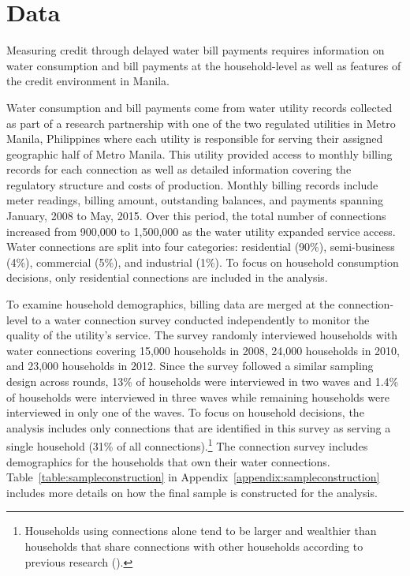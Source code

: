 \documentclass[12pt,table]{article}
\begin{document}
\section{Data}\label{section:data}



Measuring credit through delayed water bill payments requires information on water consumption and bill payments at the household-level as well as features of the credit environment in Manila.  %

Water consumption and bill payments come from water utility records collected as part of a research partnership with one of the two regulated utilities in Metro Manila, Philippines where each utility is responsible for serving their assigned geographic half of Metro Manila.  This utility provided access to monthly billing records for each connection as well as detailed information covering the regulatory structure and costs of production.  Monthly billing records include meter readings, billing amount, outstanding balances, and payments spanning January, 2008 to May, 2015. Over this period, the total number of connections increased from 900,000 to 1,500,000 as the water utility expanded service access.  Water connections are split into four categories: residential (90\%), semi-business (4\%), commercial (5\%), and industrial (1\%).  To focus on household consumption decisions, only residential connections are included in the analysis.

To examine household demographics, billing data are merged at the connection-level to a water connection survey conducted independently to monitor the quality of the utility's service.  The survey randomly interviewed households with water connections covering 15,000 households in 2008, 24,000 households in 2010, and 23,000 households in 2012.  Since the survey followed a similar sampling design across rounds, 13\% of households were interviewed in two waves and 1.4\% of households were interviewed in three waves while remaining households were interviewed in only one of the waves.  To focus on household decisions, the analysis includes only connections that are identified in this survey as serving a single household (31\% of all connections).\footnote{Households using connections alone tend to be larger and wealthier than households that share connections with other households according to previous research (\cite{wjv}).}  The connection survey includes demographics for the households that own their water connections.  Table~\ref{table:sampleconstruction} in Appendix~\ref{appendix:sampleconstruction} includes more details on how the final sample is constructed for the analysis.
\end{document}
